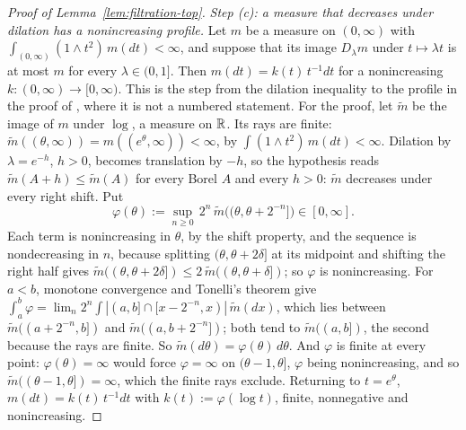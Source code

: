 \begin{proof}[Proof of Lemma~\ref{lem:filtration-top}]
\emph{Step (c): a measure that decreases under dilation has a nonincreasing profile.} Let $m$ be a
measure on $(0,\infty)$ with $\int_{(0,\infty)}(1 \wedge t^2)\,m(dt) < \infty$, and suppose that
its image $D_\lambda m$ under $t \mapsto \lambda t$ is at most $m$ for every $\lambda \in (0,1]$.
Then $m(dt) = k(t)\,t^{-1}dt$ for a nonincreasing $k : (0,\infty) \to [0,\infty)$. This is the
step from the dilation inequality to the profile in the proof of , where it is
not a numbered statement. For the proof,
let $\tilde m$ be the image of $m$ under $\log$, a measure on $\mathbb{R}$. Its rays are finite:
$\tilde m((\theta,\infty)) = m((e^\theta,\infty)) < \infty$, by $\int(1 \wedge t^2)\,m(dt) <
\infty$. Dilation by $\lambda = e^{-h}$, $h > 0$, becomes translation by $-h$, so the hypothesis
reads $\tilde m(A + h) \le \tilde m(A)$ for every Borel $A$ and every $h > 0$: $\tilde m$
decreases under every right shift. Put
\[
  \varphi(\theta) := \sup_{n \ge 0}\, 2^n\,\tilde m\bigl((\theta,\theta + 2^{-n}]\bigr) \in [0,\infty] .
\]
Each term is nonincreasing in $\theta$, by the shift property, and the sequence is nondecreasing in
$n$, because splitting $(\theta,\theta+2\delta]$ at its midpoint and shifting the right half gives
$\tilde m((\theta,\theta+2\delta]) \le 2\,\tilde m((\theta,\theta+\delta])$; so $\varphi$ is
nonincreasing. For $a < b$, monotone convergence and Tonelli's theorem give
$\int_a^b \varphi = \lim_n 2^n\int|(a,b] \cap [x - 2^{-n}, x)|\,\tilde m(dx)$, which lies between
$\tilde m((a + 2^{-n}, b])$ and $\tilde m((a, b + 2^{-n}])$; both tend to $\tilde m((a,b])$, the
second because the rays are finite. So $\tilde m(d\theta) = \varphi(\theta)\,d\theta$. And $\varphi$
is finite at every point: $\varphi(\theta) = \infty$ would force $\varphi = \infty$ on
$(\theta - 1, \theta]$, $\varphi$ being nonincreasing, and so
$\tilde m((\theta - 1,\theta]) = \infty$, which the finite rays exclude.
Returning to $t = e^\theta$, $m(dt) = k(t)\,t^{-1}dt$ with $k(t) := \varphi(\log t)$, finite,
nonnegative and nonincreasing.
\end{proof}

